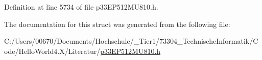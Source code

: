 Definition at line 5734 of file p33\+E\+P512\+M\+U810.\+h.



The documentation for this struct was generated from the following file\+:\begin{DoxyCompactItemize}
\item 
C\+:/\+Users/00670/\+Documents/\+Hochschule/\+\_\+\+Tier1/73304\+\_\+\+Technische\+Informatik/\+Code/\+Hello\+World4.\+X/\+Literatur/\hyperlink{p33_e_p512_m_u810_8h}{p33\+E\+P512\+M\+U810.\+h}\end{DoxyCompactItemize}
